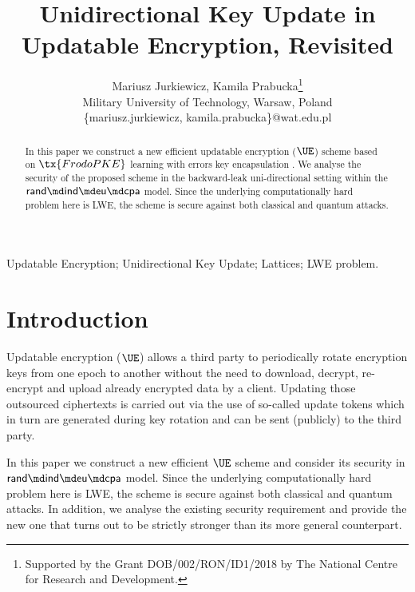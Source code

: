 \documentclass{fundam}
\begin{document}
\title{Unidirectional Key Update in Updatable Encryption, Revisited}

\address{Military University of Technology, Kaliskiego 2 00-908 Warsaw}

\author{Mariusz Jurkiewicz, Kamila Prabucka\thanks{Supported by the Grant DOB/002/RON/ID1/2018 by The National Centre for Research and Development.}\\
	Military University of Technology, Warsaw, Poland\\
	\{mariusz.jurkiewicz, kamila.prabucka\}@wat.edu.pl}

\maketitle


\begin{abstract}
	In this paper we construct a new efficient updatable encryption ($\UE$) scheme based on $\tx{FrodoPKE}$ learning with errors key encapsulation \cite{Frodo}. We analyse the security of the proposed scheme in the backward-leak uni-directional setting  within the $\mathsf{rand}\md\mathsf{ind}\md\mathsf{eu}\md\mathsf{cpa}$ model. Since the underlying computationally hard problem here is LWE, the scheme is secure against both classical and quantum attacks. 
\end{abstract}

\begin{keywords}
	Updatable Encryption; Unidirectional Key Update;  Lattices; LWE problem.
\end{keywords}


\section{Introduction}
Updatable encryption ($\UE$) allows a third party to periodically rotate encryption keys from one epoch to another without the need to download, decrypt, re-encrypt and upload already encrypted data by a client. Updating those outsourced ciphertexts is carried out via the use of so-called update tokens which in turn are generated during key rotation and can be sent (publicly) to the third party.

\vspace{0.1cm}
In this paper we construct a new efficient $\UE$ scheme and consider its security in $\mathsf{rand}\md\mathsf{ind}\md\mathsf{eu}\md\mathsf{cpa}$ model. Since the underlying computationally hard problem here is LWE, the scheme is secure against both classical and quantum attacks.  In addition, we analyse the existing security requirement and provide the new one that turns out to be strictly stronger than its more general counterpart.  
\end{document}
